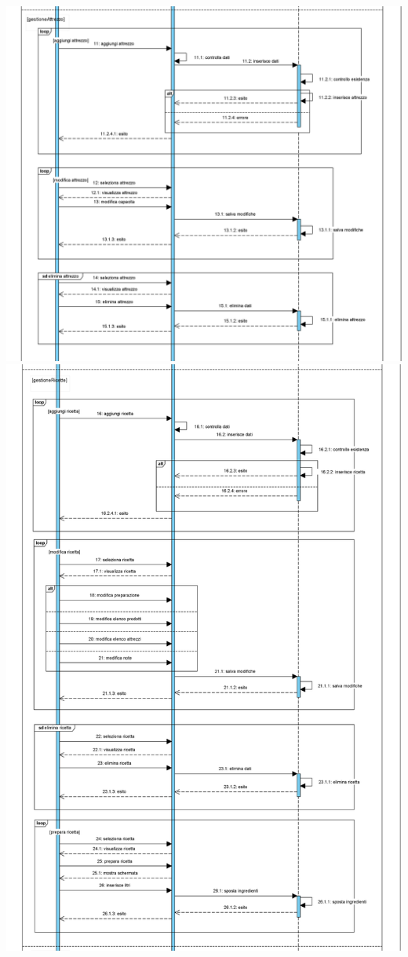 \documentclass[a4paper, titlepage]{article}
\begin{document}
\includegraphics[scale=0.30]{Immagini/Sequence Diagram_Brew Day!_4.png}
\includegraphics[scale=0.30]{Immagini/Sequence Diagram_Brew Day!_5.png}
\end{document}
